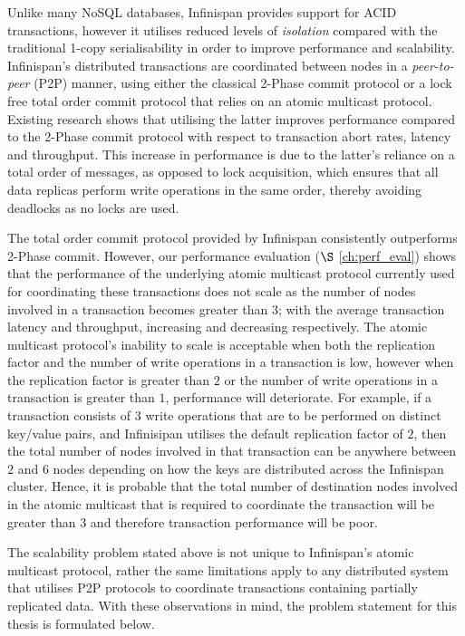     Unlike many NoSQL databases, Infinispan provides support for ACID transactions, however it utilises reduced levels of \emph{isolation} compared with the traditional 1-copy serialisability in order to improve performance and scalability.  Infinispan's distributed transactions are coordinated between nodes in a \emph{peer-to-peer} (P2P) manner, using either the classical 2-Phase commit protocol or a lock free total order commit protocol that relies on an atomic multicast protocol.  Existing research \citep{Ruivo:2011:ETO:2120967.2121604} shows that utilising the latter improves performance compared to the 2-Phase commit protocol with respect to transaction abort rates, latency and throughput.  This increase in performance is due to the latter's reliance on a total order of messages, as opposed to lock acquisition, which ensures that all data replicas perform write operations in the same order, thereby avoiding deadlocks as no locks are used.  
    
    The total order commit protocol provided by Infinispan consistently outperforms 2-Phase commit.  However, our performance evaluation ($\S$ \ref{ch:perf_eval}) shows that the performance of the underlying atomic multicast protocol currently used for coordinating these transactions does not scale as the number of nodes involved in a transaction becomes greater than $3$; with the average transaction latency and throughput, increasing and decreasing respectively.  The atomic multicast protocol's inability to scale is acceptable when both the replication factor and the number of write operations in a transaction is low, however when the replication factor is greater than $2$ or the number of write operations in a transaction is greater than $1$, performance will deteriorate.  For example, if a transaction consists of $3$ write operations that are to be performed on distinct key/value pairs, and Infinisipan utilises the default replication factor of $2$, then the total number of nodes involved in that transaction can be anywhere between $2$ and $6$ nodes depending on how the keys are distributed across the Infinispan cluster.  Hence, it is probable that the total number of destination nodes involved in the atomic multicast that is required to coordinate the transaction will be greater than $3$ and therefore transaction performance will be poor.  
    
    The scalability problem stated above is not unique to Infinispan's atomic multicast protocol, rather the same limitations apply to any distributed system that utilises P2P protocols to coordinate transactions containing partially replicated data.  With these observations in mind, the problem statement for this thesis is formulated below.
    
